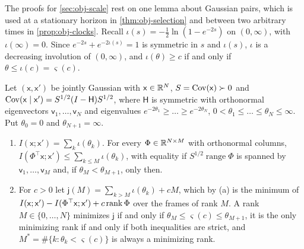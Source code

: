 The proofs for \cref{sec:obj-scale} rest on one lemma about Gaussian pairs, which is used at a stationary horizon in \cref{thm:obj-selection} and between two arbitrary times in \cref{prop:obj-clocks}. Recall $\iota(s)=-\frac12\ln(1-e^{-2s})$ on $(0,\infty)$, with $\iota(\infty)=0$. Since $e^{-2s}+e^{-2\iota(s)}=1$ is symmetric in $s$ and $\iota(s)$, $\iota$ is a decreasing involution of $(0,\infty)$, and $\iota(\theta)\ge c$ if and only if $\theta\le\iota(c)=\varsigma(c)$.

\begin{lemma}\label{lem:obj-compression}
Let $(\mathsf x,\mathsf x')$ be jointly Gaussian with $\mathsf x\in\mathbb{R}^N$, $S=\operatorname{Cov}(\mathsf x)\succ0$ and $\operatorname{Cov}(\mathsf x\mid\mathsf x')=S^{1/2}(I-\mathsf H)S^{1/2}$, where $\mathsf H$ is symmetric with orthonormal eigenvectors $\mathsf v_1,\dots,\mathsf v_N$ and eigenvalues $e^{-2\theta_1}\ge\dots\ge e^{-2\theta_N}$, $0<\theta_1\le\dots\le\theta_N\le\infty$. Put $\theta_0=0$ and $\theta_{N+1}=\infty$.
\begin{enumerate}
\item[(a)] $I(\mathsf x;\mathsf x')=\sum_k\iota(\theta_k)$. For every $\Phi\in\mathbb{R}^{N\times M}$ with orthonormal columns, $I(\Phi^\top\mathsf x;\mathsf x')\le\sum_{k\le M}\iota(\theta_k)$, with equality if $S^{1/2}\operatorname{range}\Phi$ is spanned by $\mathsf v_1,\dots,\mathsf v_M$ and, if $\theta_M<\theta_{M+1}$, only then.
\item[(b)] For $c>0$ let $\mathsf j(M)=\sum_{k>M}\iota(\theta_k)+cM$, which by (a) is the minimum of $I(\mathsf x;\mathsf x')-I(\Phi^\top\mathsf x;\mathsf x')+c\operatorname{rank}\Phi$ over the frames of rank $M$. A rank $M\in\{0,\dots,N\}$ minimizes $\mathsf j$ if and only if $\theta_M\le\varsigma(c)\le\theta_{M+1}$, it is the only minimizing rank if and only if both inequalities are strict, and $M^\ast=\#\{k:\theta_k<\varsigma(c)\}$ is always a minimizing rank.
\end{enumerate}
\end{lemma}

